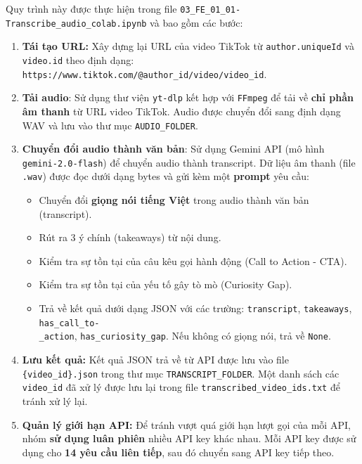 \noindent
Quy trình này được thực hiện trong file \texttt{03\_FE\_01\_01-Transcribe\_audio\_colab.ipynb} và bao gồm các bước:
\begin{enumerate}
    \item \textbf{Tái tạo URL:} Xây dựng lại URL của video TikTok từ \texttt{author.uniqueId} và \texttt{video.id} theo định dạng: \texttt{https://www.tiktok.com/@{author\_id}/video/{video\_id}}.
    
    \item \textbf{Tải audio}: Sử dụng thư viện \texttt{yt-dlp} kết hợp với \texttt{FFmpeg} để tải về \textbf{chỉ phần âm thanh} từ URL video TikTok. Audio được chuyển đổi sang định dạng WAV và lưu vào thư mục \texttt{AUDIO\_FOLDER}.
    
    \item \textbf{Chuyển đổi audio thành văn bản}: Sử dụng Gemini API (mô hình \texttt{gemini-2.0-flash}) để chuyển audio thành transcript. Dữ liệu âm thanh (file \texttt{.wav}) được đọc dưới dạng bytes và gửi kèm một \textbf{prompt} yêu cầu:
    \begin{itemize}
        \item Chuyển đổi \textbf{giọng nói tiếng Việt} trong audio thành văn bản (transcript).
        
        \item Rút ra 3 ý chính (takeaways) từ nội dung.
        
        \item Kiểm tra sự tồn tại của câu kêu gọi hành động (Call to Action - CTA).
        
        \item Kiểm tra sự tồn tại của yếu tố gây tò mò (Curiosity Gap).
        
        \item Trả về kết quả dưới dạng JSON với các trường: \texttt{transcript}, \texttt{takeaways}, \texttt{has\_call\_to-\\\_action}, \texttt{has\_curiosity\_gap}. Nếu không có giọng nói, trả về \texttt{None}.
    \end{itemize}
    
    \item \textbf{Lưu kết quả:} Kết quả JSON trả về từ API được lưu vào file \texttt{\{video\_id\}.json} trong thư mục \texttt{TRANSCRIPT\_FOLDER}. Một danh sách các \texttt{video\_id} đã xử lý được lưu lại trong file \texttt{transcribed\_video\_ids.txt} để tránh xử lý lại. 
    
    \item \textbf{Quản lý giới hạn API:} Để tránh vượt quá giới hạn lượt gọi của mỗi API, nhóm \textbf{sử dụng luân phiên} nhiều API key khác nhau. Mỗi API key được sử dụng cho \textbf{14 yêu cầu liên tiếp}, sau đó chuyển sang API key tiếp theo.
\end{enumerate}

